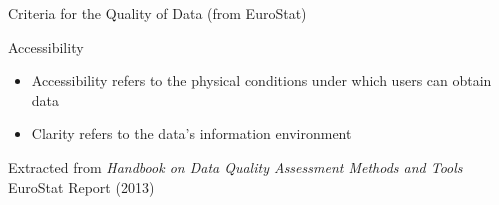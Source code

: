 \documentclass[xcolor=x11names,compress,8pt,
handout
]{beamer}
\renewcommand{\(}{\begin{columns}}
\renewcommand{\)}{\end{columns}}
\newcommand{\<}[1]{\begin{column}{#1}}
\renewcommand{\>}{\end{column}}
\begin{document}
\begin{frame}{Criteria for the Quality of Data (from EuroStat)}
\begin{alertblock}{Accessibility}
\begin{itemize}
\item Accessibility refers to the physical conditions under which users can obtain data
\item Clarity refers to the data’s information environment
\end{itemize}
\end{alertblock}

\vfill

Extracted from \textit{Handbook on Data Quality
Assessment Methods and Tools} EuroStat Report (2013)
\end{frame}
\end{document}
